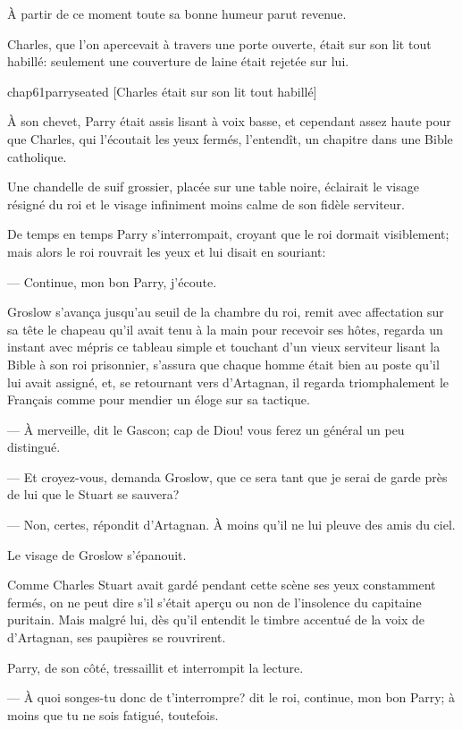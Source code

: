 À partir de ce moment toute sa bonne humeur parut revenue.

Charles, que l'on apercevait à travers une porte ouverte, était sur son lit tout habillé: seulement une couverture de laine était rejetée sur lui.

\begin{bwbigpic}
	[\basicscale] 
	{chap61parryseated}
	[Charles était sur son lit tout habillé]
\end{bwbigpic}

À son chevet, Parry était assis lisant à voix basse, et cependant assez haute pour que Charles, qui l'écoutait les yeux fermés, l'entendît, un chapitre dans une Bible catholique.

Une chandelle de suif grossier, placée sur une table noire, éclairait le visage résigné du roi et le visage infiniment moins calme de son fidèle serviteur.

De temps en temps Parry s'interrompait, croyant que le roi dormait visiblement; mais alors le roi rouvrait les yeux et lui disait en souriant:

— Continue, mon bon Parry, j'écoute.

Groslow s'avança jusqu'au seuil de la chambre du roi, remit avec affectation sur sa tête le chapeau qu'il avait tenu à la main pour recevoir ses hôtes, regarda un instant avec mépris ce tableau simple et touchant d'un vieux serviteur lisant la Bible à son roi prisonnier, s'assura que chaque homme était bien au poste qu'il lui avait assigné, et, se retournant vers d'Artagnan, il regarda triomphalement le Français comme pour mendier un éloge sur sa tactique.

— À merveille, dit le Gascon; cap de Diou! vous ferez un général un peu distingué.

— Et croyez-vous, demanda Groslow, que ce sera tant que je serai de garde près de lui que le Stuart se sauvera?

— Non, certes, répondit d'Artagnan. À moins qu'il ne lui pleuve des amis du ciel.

Le visage de Groslow s'épanouit.

Comme Charles Stuart avait gardé pendant cette scène ses yeux constamment fermés, on ne peut dire s'il s'était aperçu ou non de l'insolence du capitaine puritain. Mais malgré lui, dès qu'il entendit le timbre accentué de la voix de d'Artagnan, ses paupières se rouvrirent.

Parry, de son côté, tressaillit et interrompit la lecture.

— À quoi songes-tu donc de t'interrompre? dit le roi, continue, mon bon Parry; à moins que tu ne sois fatigué, toutefois.

